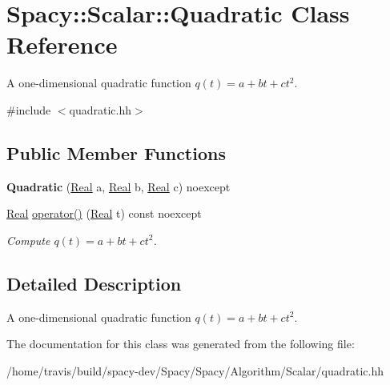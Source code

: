 \hypertarget{classSpacy_1_1Scalar_1_1Quadratic}{\section{\-Spacy\-:\-:\-Scalar\-:\-:\-Quadratic \-Class \-Reference}
\label{classSpacy_1_1Scalar_1_1Quadratic}
}


\-A one-\/dimensional quadratic function $q(t) = a + bt + ct^2$.  




{\ttfamily \#include $<$quadratic.\-hh$>$}

\subsection*{\-Public \-Member \-Functions}
\begin{DoxyCompactItemize}
\item 
\hypertarget{classSpacy_1_1Scalar_1_1Quadratic_a350f7d637e9cb093a6dee091f138edfb}{{\bfseries \-Quadratic} (\hyperlink{classSpacy_1_1Real}{\-Real} a, \hyperlink{classSpacy_1_1Real}{\-Real} b, \hyperlink{classSpacy_1_1Real}{\-Real} c) noexcept}\label{classSpacy_1_1Scalar_1_1Quadratic_a350f7d637e9cb093a6dee091f138edfb}

\item 
\hypertarget{classSpacy_1_1Scalar_1_1Quadratic_a0289f0fe37afe6d44465975c44fae80d}{\hyperlink{classSpacy_1_1Real}{\-Real} \hyperlink{classSpacy_1_1Scalar_1_1Quadratic_a0289f0fe37afe6d44465975c44fae80d}{operator()} (\hyperlink{classSpacy_1_1Real}{\-Real} t) const noexcept}\label{classSpacy_1_1Scalar_1_1Quadratic_a0289f0fe37afe6d44465975c44fae80d}

\begin{DoxyCompactList}\small\item\em \-Compute $q(t) = a + bt + ct^2 $. \end{DoxyCompactList}\end{DoxyCompactItemize}


\subsection{\-Detailed \-Description}
\-A one-\/dimensional quadratic function $q(t) = a + bt + ct^2$. 

\-The documentation for this class was generated from the following file\-:\begin{DoxyCompactItemize}
\item 
/home/travis/build/spacy-\/dev/\-Spacy/\-Spacy/\-Algorithm/\-Scalar/quadratic.\-hh\end{DoxyCompactItemize}
